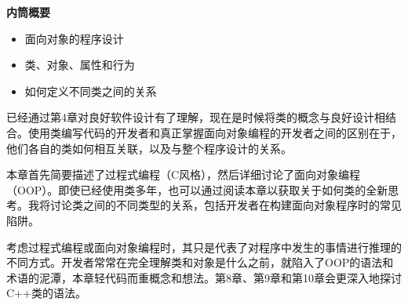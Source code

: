 \noindent
\textbf{内筒概要}

\begin{itemize}
\item
面向对象的程序设计

\item
类、对象、属性和行为

\item
如何定义不同类之间的关系
\end{itemize}

已经通过第4章对良好软件设计有了理解，现在是时候将类的概念与良好设计相结合。使用类编写代码的开发者和真正掌握面向对象编程的开发者之间的区别在于，他们各自的类如何相互关联，以及与整个程序设计的关系。

本章首先简要描述了过程式编程（C风格），然后详细讨论了面向对象编程（OOP）。即使已经使用类多年，也可以通过阅读本章以获取关于如何类的全新思考。我将讨论类之间的不同类型的关系，包括开发者在构建面向对象程序时的常见陷阱。

考虑过程式编程或面向对象编程时，其只是代表了对程序中发生的事情进行推理的不同方式。开发者常常在完全理解类和对象是什么之前，就陷入了OOP的语法和术语的泥潭，本章轻代码而重概念和想法。第8章、第9章和第10章会更深入地探讨C++类的语法。















